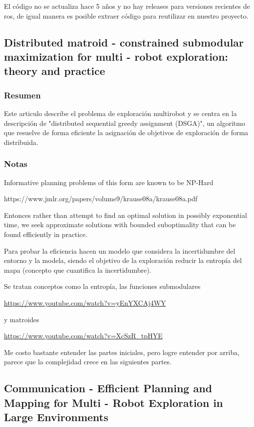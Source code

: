 El código no se actualiza hace 5 años y no hay releases para versiones recientes de ros, de igual manera es posible extraer código para reutilizar en nuestro proyecto.

\subsection{Distributed matroid - constrained submodular maximization for multi - robot exploration: theory and practice}
\subsubsection{Resumen}
Este articulo describe el problema de exploración multirobot y se centra en la descripción de "distributed sequential greedy assignment (DSGA)", un algoritmo que resuelve de forma eficiente la asignación de objetivos de exploración de forma distribuida.

\subsubsection{Notas}
Informative planning problems of this form are known to be NP-Hard 

https://www.jmlr.org/papers/volume9/krause08a/krause08a.pdf

Entonces rather than attempt to find an optimal solution in possibly exponential time, we seek approximate solutions with bounded suboptimality that can be found efficiently in practice.

Para probar la eficiencia hacen un modelo que considera la incertidumbre del entorno y la modela, siendo el objetivo de la exploración reducir la entropía del mapa (concepto que cuantifica la incertidumbre).

Se tratan conceptos como la entropía, las funciones submodulares

\url{https://www.youtube.com/watch?v=yEnYXCAj4WY}

y matroides

\url{https://www.youtube.com/watch?v=XcSzR_tpHYE}

Me costo bastante entender las partes iniciales, pero logre entender por arriba, parece que la complejidad crece en las siguientes partes.

\subsection{Communication - Efficient Planning and Mapping for Multi - Robot Exploration in Large Environments}
